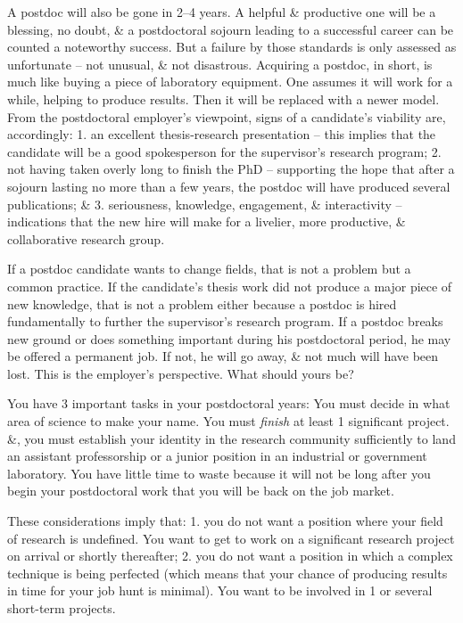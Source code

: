 \documentclass{article}
\begin{document}
\begin{enumerate}
\begin{itemize}
\begin{itemize}
			A postdoc will also be gone in 2--4 years. A helpful \& productive one will be a blessing, no doubt, \& a postdoctoral sojourn leading to a successful career can be counted a noteworthy success. But a failure by those standards is only assessed as unfortunate -- not unusual, \& not disastrous. Acquiring a postdoc, in short, is much like buying a piece of laboratory equipment. One assumes it will work for a while, helping to produce results. Then it will be replaced with a newer model. From the postdoctoral employer's viewpoint, signs of a candidate's viability are, accordingly: 1. an excellent thesis-research presentation -- this implies that the candidate will be a good spokesperson for the supervisor's research program; 2. not having taken overly long to finish the PhD -- supporting the hope that after a sojourn lasting no more than a few years, the postdoc will have produced several publications; \& 3. seriousness, knowledge, engagement, \& interactivity -- indications that the new hire will make for a livelier, more productive, \& collaborative research group.
			
			If a postdoc candidate wants to change fields, that is not a problem but a common practice. If the candidate's thesis work did not produce a major piece of new knowledge, that is not a problem either because a postdoc is hired fundamentally to further the supervisor's research program. If a postdoc breaks new ground or does something important during his postdoctoral period, he may be offered a permanent job. If not, he will go away, \& not much will have been lost. This is the employer's perspective. What should yours be?
			
			You have 3 important tasks in your postdoctoral years: You must decide in what area of science to make your name. You must \textit{finish} at least 1 significant project. \&, you must establish your identity in the research community sufficiently to land an assistant professorship or a junior position in an industrial or government laboratory. You have little time to waste because it will not be long after you begin your postdoctoral work that you will be back on the job market.
			
			These considerations imply that: 1. you do not want a position where your field of research is undefined. You want to get to work on a significant research project on arrival or shortly thereafter; 2. you do not want a position in which a complex technique is being perfected (which means that your chance of producing results in time for your job hunt is minimal). You want to be involved in 1 or several short-term projects.
			

\end{itemize}
\end{itemize}
\end{enumerate}
\end{document}
